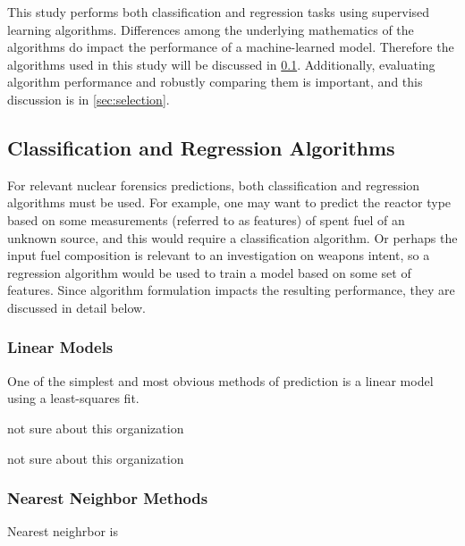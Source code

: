 This study performs both classification and regression tasks using supervised
learning algorithms.  Differences among the underlying mathematics  of the algorithms do impact the performance of a machine-learned model.
Therefore the algorithms used in this study will be discussed in
\ref{sec:algs}. Additionally, evaluating algorithm performance and robustly
comparing them is important, and this discussion is in \ref{sec:selection}.

\subsection{Classification and Regression Algorithms}
\label{sec:algs}

For relevant nuclear forensics predictions, both classification and regression
algorithms must be used.  For example, one may want to predict the reactor type
based on some measurements (referred to as features) of spent fuel of an
unknown source, and this would require a classification algorithm. Or perhaps
the input fuel composition is relevant to an investigation on weapons intent,
so a regression algorithm would be used to train a model based on some set of
features.  Since algorithm formulation impacts the resulting performance, they
are discussed in detail below.  


\subsubsection{Linear Models}
\label{sec:linear}

One of the simplest and most obvious methods of prediction is a linear model using a least-squares 
fit. 

\label{sec:ridge}

not sure about this organization



not sure about this organization

\subsubsection{Nearest Neighbor Methods}
\label{sec:neighbor}

Nearest neighrbor is 

